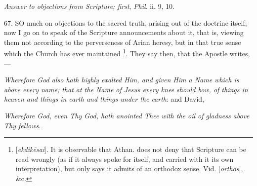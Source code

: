 
\emph{Answer
to objections from Scripture; first}, \emph{Phil}.
ii. 9, 10.

67. SO
much on objections to the sacred truth, arising out of the doctrine
itself; now I go on to speak of the Scripture announcements about it,
that is, viewing them not according to the perverseness of Arian
heresy, but in that true sense which the Church has ever maintained \footnote{[\emph{ekdik\={e}sai}]. It is observable that Athan. does not deny
that Scripture can be read wrongly (as if it always spoke for itself,
and carried with it its own interpretation), but only says it admits
of an orthodox sense. Vid. [\emph{orthos}], \&c.}. They say then, that the Apostle writes,—

\emph{Wherefore God also hath
highly exalted Him, and given Him a Name which is above every name;
that at the Name of Jesus every knee should bow, of things in heaven
and things in earth and things under the earth}:
and David,

\emph{Wherefore God, even Thy
God, hath anointed Thee with the oil of gladness above Thy fellows}.

